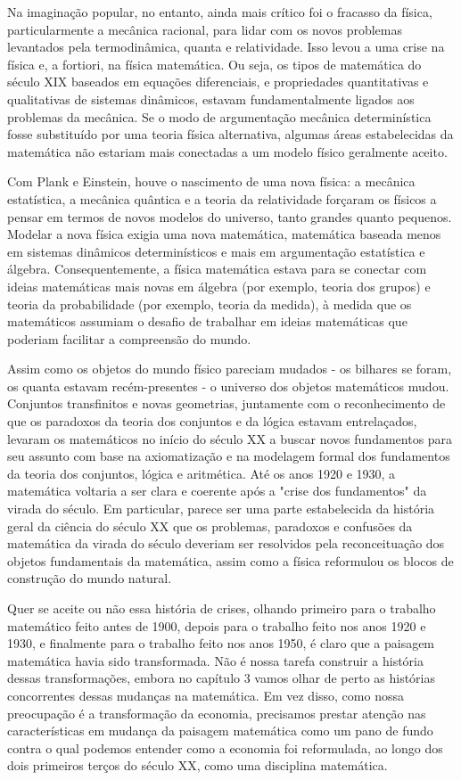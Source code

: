 \documentclass[a4paper,12pt]{article}[abntex2]
\begin{document}
Na imaginação popular, no entanto, ainda mais crítico foi o fracasso da física, particularmente a mecânica racional, para lidar com os novos problemas levantados pela termodinâmica, quanta e relatividade. Isso levou a uma crise na física e, a fortiori, na física matemática. Ou seja, os tipos de matemática do século XIX baseados em equações diferenciais, e propriedades quantitativas e qualitativas de sistemas dinâmicos, estavam fundamentalmente ligados aos problemas da mecânica. Se o modo de argumentação mecânica determinística fosse substituído por uma teoria física alternativa, algumas áreas estabelecidas da matemática não estariam mais conectadas a um modelo físico geralmente aceito.

Com Plank e Einstein, houve o nascimento de uma nova física: a mecânica estatística, a mecânica quântica e a teoria da relatividade forçaram os físicos a pensar em termos de novos modelos do universo, tanto grandes quanto pequenos. Modelar a nova física exigia uma nova matemática, matemática baseada menos em sistemas dinâmicos determinísticos e mais em argumentação estatística e álgebra. Consequentemente, a física matemática estava para se conectar com ideias matemáticas mais novas em álgebra (por exemplo, teoria dos grupos) e teoria da probabilidade (por exemplo, teoria da medida), à medida que os matemáticos assumiam o desafio de trabalhar em ideias matemáticas que poderiam facilitar a compreensão do mundo.

Assim como os objetos do mundo físico pareciam mudados - os bilhares se foram, os quanta estavam recém-presentes - o universo dos objetos matemáticos mudou. Conjuntos transfinitos e novas geometrias, juntamente com o reconhecimento de que os paradoxos da teoria dos conjuntos e da lógica estavam entrelaçados, levaram os matemáticos no início do século XX a buscar novos fundamentos para seu assunto com base na axiomatização e na modelagem formal dos fundamentos da teoria dos conjuntos, lógica e aritmética. Até os anos 1920 e 1930, a matemática voltaria a ser clara e coerente após a "crise dos fundamentos" da virada do século. Em particular, parece ser uma parte estabelecida da história geral da ciência do século XX que os problemas, paradoxos e confusões da matemática da virada do século deveriam ser resolvidos pela reconceituação dos objetos fundamentais da matemática, assim como a física reformulou os blocos de construção do mundo natural.

Quer se aceite ou não essa história de crises, olhando primeiro para o trabalho matemático feito antes de 1900, depois para o trabalho feito nos anos 1920 e 1930, e finalmente para o trabalho feito nos anos 1950, é claro que a paisagem matemática havia sido transformada. Não é nossa tarefa construir a história dessas transformações, embora no capítulo 3 vamos olhar de perto as histórias concorrentes dessas mudanças na matemática. Em vez disso, como nossa preocupação é a transformação da economia, precisamos prestar atenção nas características em mudança da paisagem matemática como um pano de fundo contra o qual podemos entender como a economia foi reformulada, ao longo dos dois primeiros terços do século XX, como uma disciplina matemática.
\end{document}

